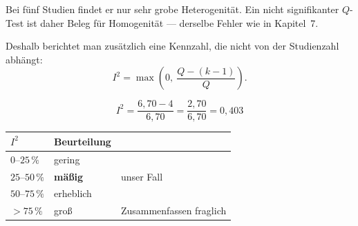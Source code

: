 \begin{warnung}
Bei fünf Studien findet er nur sehr grobe Heterogenität. Ein nicht signifikanter $Q$-Test ist daher  Beleg für Homogenität --- derselbe Fehler wie in Kapitel~7.

Deshalb berichtet man zusätzlich eine Kennzahl, die nicht von der Studienzahl abhängt:
\[ I^2 = \max\left(0,\ \frac{Q - (k-1)}{Q}\right) . \]

\[ I^2 = \frac{6{,}70 - 4}{6{,}70} = \frac{2{,}70}{6{,}70} = 0{,}403 \]

\begin{center}
\renewcommand{\arraystretch}{1.45}
\begin{tabular}{@{}P{2.0cm}P{2.4cm}P{2.8cm}@{}}
\toprule
$I^2$ & \textbf{Beurteilung} & \\
\midrule
$0$--$25\,\%$ & gering & \\
$25$--$50\,\%$ & \textbf{mäßig} & \textcolor{akzent}{unser Fall}\\
$50$--$75\,\%$ & erheblich & \\
$> 75\,\%$ & groß & \textcolor{akzent}{Zusammen\-fassen fraglich}\\
\bottomrule
\end{tabular}
\end{center}

\begin{center}
\begin{minipage}{0.88\textwidth}
\end{minipage}
\end{center}
\end{warnung}

